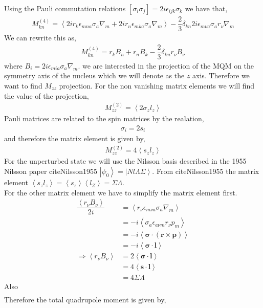 \documentclass[8pt,a4paper, twoside]{report}
\begin{document}
Using the Pauli commutation relations $\left[\sigma_i\sigma_j\right] = 2i\epsilon_{ijk}\sigma_k$ we have that,
\begin{align*}
M^{(4)}_{kn} = \left<2ir_k\epsilon_{mna}\sigma_a\nabla_m + 2ir_n\epsilon_{mka}\sigma_a\nabla_m\right> - \dfrac{2}{3}\delta_{kn}2i\epsilon_{m\nu a}\sigma_{a}r_{\nu}\nabla_{m}
\end{align*}
We can rewrite this as,
\begin{align*}
M^{(4)}_{kn} = r_kB_n + r_nB_k - \dfrac{2}{3}\delta_{kn}r_{\nu}B_{\nu}
\end{align*}
where $B_{i} = 2i\epsilon_{mia}\sigma_a\nabla_m$. we are interested in the projection of the MQM on the symmetry axis of the nucleus which we will denote as the $z$ axis. Therefore we want to find $M_{zz}$ projection. For the non vanishing matrix elements we will find the value of the projection,
\begin{align*}
M_{zz}^{(2)} = \left<2\sigma_zl_z\right>
\end{align*}
Pauli matrices are related to the spin matrices by the realation,
\begin{align*}
\sigma_i = 2s_i
\end{align*}
and therefore the matrix element is given by,
\begin{align*}
M_{zz}^{(2)} = 4\left<s_zl_z\right>
\end{align*}
For the unperturbed state we will use the Nilsson basis described in the 1955 Nilsson paper citeNilsson1955 $\left|\psi_0\right> = \left|Nl\Lambda\Sigma\right>$. From citeNilsson1955 the matrix element $\left<s_zl_z\right> = \left<s_z\right>\left<l_Z\right> = \Sigma\Lambda$. \\
For the other matrix element we have to simplify the matrix element first. \\

\begin{align*}
\dfrac{\left<r_{\nu}B_{\nu}\right>}{2i} &= \left<r_{\nu}\epsilon_{m\nu a}\sigma_a \nabla_m\right> \\
&= -i\left<\sigma_a\epsilon_{a\nu m}r_{\nu} p_{m} \right> \\
&= -i\left<\boldsymbol{\sigma}\cdot\left(\textbf{r} \times \textbf{p}\right)\right> \\
&= -i\left<\boldsymbol{\sigma}\cdot\textbf{l}\right> \\ 
\Rightarrow \left<r_{\nu}B_{\nu}\right> &= 2\left<\boldsymbol{\sigma}\cdot\textbf{l}\right> \\
&= 4\left<\textbf{s}\cdot\textbf{l}\right> \\
&= 4\Sigma\Lambda
\end{align*}
Also
\begin{align*}
\end{align*}
Therefore the total quadrupole moment is given by,
\end{document}
